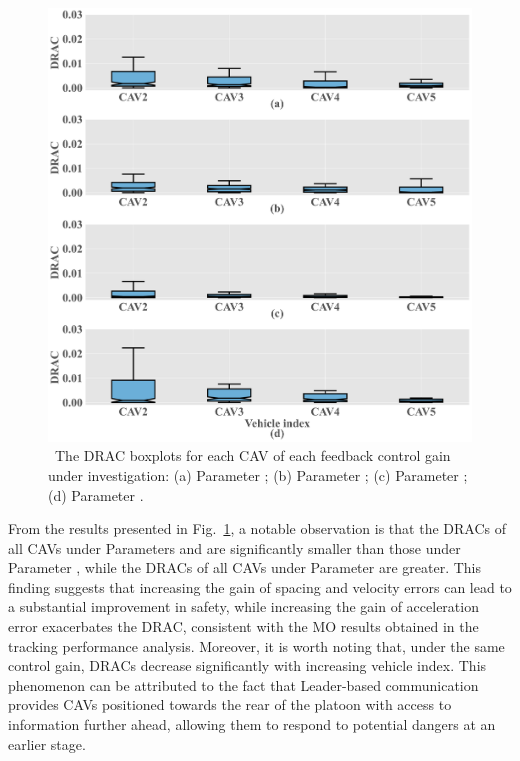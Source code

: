 \documentclass[a4paper]{cas-sc}
\begin{document}
\begin{figure}
  \centering
  \includegraphics[width=14cm]{figs/fig8.png}
  \caption{~The DRAC boxplots for each CAV of each feedback control gain under investigation: (a) Parameter \uppercase\expandafter{}; (b) Parameter \uppercase\expandafter{}; (c) Parameter \uppercase\expandafter{}; (d) Parameter \uppercase\expandafter{}.}
  \label{fig8}
\end{figure}


From the results presented in Fig.~\ref{fig8}, a notable observation is that the DRACs of all CAVs under Parameters \uppercase\expandafter{} and \uppercase\expandafter{} are significantly smaller than those under Parameter \uppercase\expandafter{}, while the DRACs of all CAVs under Parameter \uppercase\expandafter{} are greater. This finding suggests that increasing the gain of spacing and velocity errors can lead to a substantial improvement in safety, while increasing the gain of acceleration error exacerbates the DRAC, consistent with the MO results obtained in the tracking performance analysis. Moreover, it is worth noting that, under the same control gain, DRACs decrease significantly with increasing vehicle index. This phenomenon can be attributed to the fact that Leader-based communication provides CAVs positioned towards the rear of the platoon with access to information further ahead, allowing them to respond to potential dangers at an earlier stage.
\end{document}
